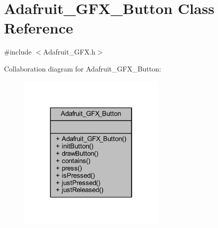 \hypertarget{class_adafruit___g_f_x___button}{}\section{Adafruit\+\_\+\+G\+F\+X\+\_\+\+Button Class Reference}
\label{class_adafruit___g_f_x___button}


{\ttfamily \#include $<$Adafruit\+\_\+\+G\+F\+X.\+h$>$}



Collaboration diagram for Adafruit\+\_\+\+G\+F\+X\+\_\+\+Button\+:
\nopagebreak
\begin{figure}[H]
\begin{center}
\leavevmode
\includegraphics[width=202pt]{d9/dc7/class_adafruit___g_f_x___button__coll__graph}
\end{center}
\end{figure}
